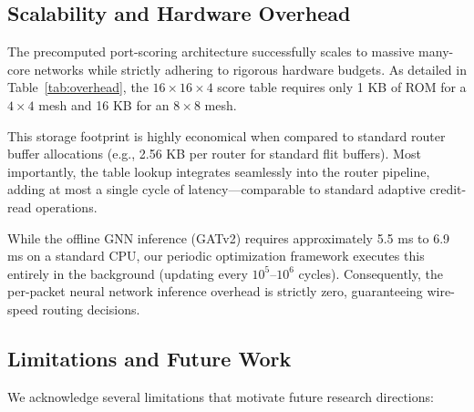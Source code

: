 \subsection{Scalability and Hardware Overhead}

The precomputed port-scoring architecture successfully scales to massive many-core networks while strictly adhering to rigorous hardware budgets. As detailed in Table~\ref{tab:overhead}, the $16\times16\times4$ score table requires only 1 KB of ROM for a $4\times4$ mesh and 16 KB for an $8\times8$ mesh.

\begin{table}[h]
\centering
\caption{Overhead analysis of GNN-based routing across mesh sizes}
\label{tab:overhead}
\end{table}

This storage footprint is highly economical when compared to standard router buffer allocations (e.g., 2.56 KB per router for standard flit buffers). Most importantly, the table lookup integrates seamlessly into the router pipeline, adding at most a single cycle of latency---comparable to standard adaptive credit-read operations.

While the offline GNN inference (GATv2) requires approximately 5.5 ms to 6.9 ms on a standard CPU, our periodic optimization framework executes this entirely in the background (updating every $10^5$--$10^6$ cycles). Consequently, the per-packet neural network inference overhead is strictly zero, guaranteeing wire-speed routing decisions.

\subsection{Limitations and Future Work}

We acknowledge several limitations that motivate future research directions:

